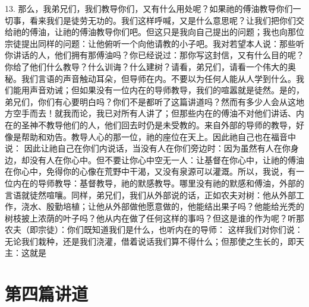 13.   那么，我弟兄们，我们教导你们，又有什么用处呢？如果祂的傅油教导你们一切事，看来我们是徒劳无功的。我们这样呼喊，又是什么意思呢？让我们把你们交给祂的傅油，让祂的傅油教导你们吧。但这只是我向自己提出的问题；我也向那位宗徒提出同样的问题：让他俯听一个向他请教的小子吧。我对若望本人说：那些听你讲话的人，他们拥有那傅油吗？你已经说过：那你写这封信，又有什么目的呢？你给了他们什么教导？什么训诲？什么建树？请看，弟兄们，请看一个伟大的奥秘。我们言语的声音触动耳朵，但导师在内。不要以为任何人能从人学到什么。我们能用声音劝诫；但如果没有一位内在的导师教导，我们的喧嚣就是徒然。是的，弟兄们，你们有心要明白吗？你们不是都听了这篇讲道吗？然而有多少人会从这地方空手而去！就我而论，我已对所有人讲了；但那些内在的傅油不对他们讲话、内在的圣神不教导他们的人，他们回去时仍是未受教的。来自外部的导师的教导，好像是帮助和劝告。教导人心的那一位，祂的座位在天上。因此祂自己也在福音中说：  因此让祂自己在你们内说话，当没有人在你们旁边时：因为虽然有人在你身边，却没有人在你心中。但不要让你心中空无一人：让基督在你心中，让祂的傅油在你心中，免得你的心像在荒野中干渴，又没有泉源可以灌溉。所以，我说，有一位内在的导师教导：基督教导，祂的默感教导。哪里没有祂的默感和傅油，外部的言语就徒然喧嚷。同样，弟兄们，我们从外部说的话，正如农夫对树：他从外部工作，浇水、殷勤培植；让他从外部做他愿意做的，他能结出果子吗？他能给光秃的树枝披上浓荫的叶子吗？他从内在做了任何这样的事吗？但这是谁的作为呢？听那农夫（即宗徒）：你们既知道我们是什么，也听内在的导师：  这样我们对你们说：无论我们栽种，还是我们浇灌，借着说话我们算不得什么；但那使之生长的，即天主：这就是\par



\section{第四篇讲道}


